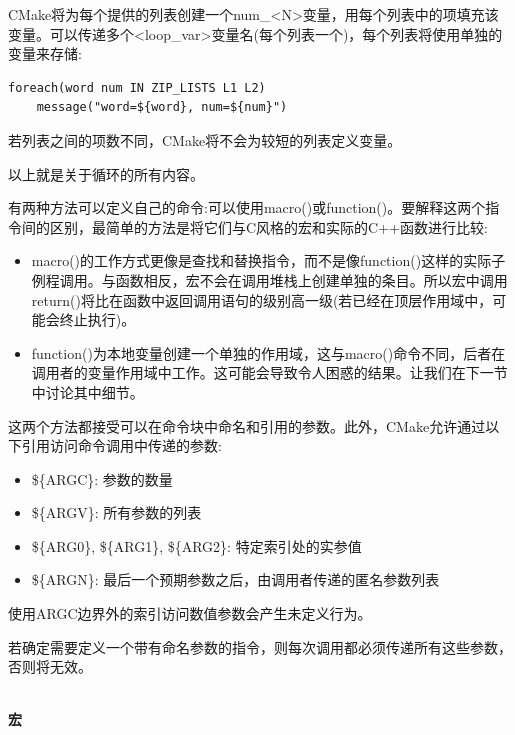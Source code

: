 CMake将为每个提供的列表创建一个num\_<N>变量，用每个列表中的项填充该变量。可以传递多个<loop\_var>变量名(每个列表一个)，每个列表将使用单独的变量来存储:

\begin{lstlisting}[style=styleCMake]
foreach(word num IN ZIP_LISTS L1 L2)
	message("word=${word}, num=${num}")
\end{lstlisting}

若列表之间的项数不同，CMake将不会为较短的列表定义变量。

以上就是关于循环的所有内容。


有两种方法可以定义自己的命令:可以使用macro()或function()。要解释这两个指令间的区别，最简单的方法是将它们与C风格的宏和实际的C++函数进行比较:

\begin{itemize}
\item 
macro()的工作方式更像是查找和替换指令，而不是像function()这样的实际子例程调用。与函数相反，宏不会在调用堆栈上创建单独的条目。所以宏中调用return()将比在函数中返回调用语句的级别高一级(若已经在顶层作用域中，可能会终止执行)。

\item 
function()为本地变量创建一个单独的作用域，这与macro()命令不同，后者在调用者的变量作用域中工作。这可能会导致令人困惑的结果。让我们在下一节中讨论其中细节。
\end{itemize}

这两个方法都接受可以在命令块中命名和引用的参数。此外，CMake允许通过以下引用访问命令调用中传递的参数:

\begin{itemize}
\item 
\$\{ARGC\}: 参数的数量

\item 
\$\{ARGV\}: 所有参数的列表

\item 
\$\{ARG0\}, \$\{ARG1\}, \$\{ARG2\}: 特定索引处的实参值

\item 
\$\{ARGN\}: 最后一个预期参数之后，由调用者传递的匿名参数列表
\end{itemize}

使用ARGC边界外的索引访问数值参数会产生未定义行为。

若确定需要定义一个带有命名参数的指令，则每次调用都必须传递所有这些参数，否则将无效。

\hspace*{\fill} \\ %
\noindent
\textbf{宏}


